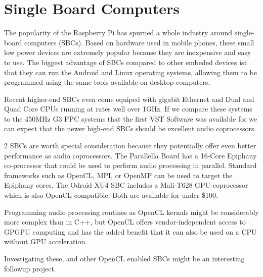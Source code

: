\section{Single Board Computers}

The popularity of the Raspberry Pi has spurned a whole industry around single-board computers (SBCs). Based on hardware used in mobile phones, these small low power devices are extremely popular because they are inexpensive and easy to use. The biggest advantage of SBCs compared to other embeded devices ist that they can run the Android and Linux operating systems, allowing them to be programmed using the same tools available on desktop computers.

Recent higher-end SBCs even come equiped with gigabit Ethernet and Dual and Quad Core CPUs running at rates well over 1GHz. If we compare these systems to the 450MHz G3 PPC systems that the first VST Software was available for we can expect that the newer high-end SBCs should be excellent audio coprocessors.

2 SBCs are worth special consideration because they potentially offer even better performance as audio coprocessors. The Parallella Board has a 16-Core Epiphany co-processor that could be used to perform audio processing in parallel. Standard frameworks such as OpenCL, MPI, or OpenMP can be used to target the Epiphany cores. The Odroid-XU4 SBC includes a Mali-T628 GPU coprocessor which is also OpenCL compatible. Both are available for under \$100.

Programming audio processing routines as OpenCL kernals might be considerably more complex than in C++, but OpenCL offers vendor-independent access to GPGPU computing and has the added benefit that it can also be used on a CPU without GPU acceleration\cite{vst-gpu}.

Investigating these, and other OpenCL enabled SBCs might be an interesting followup project.